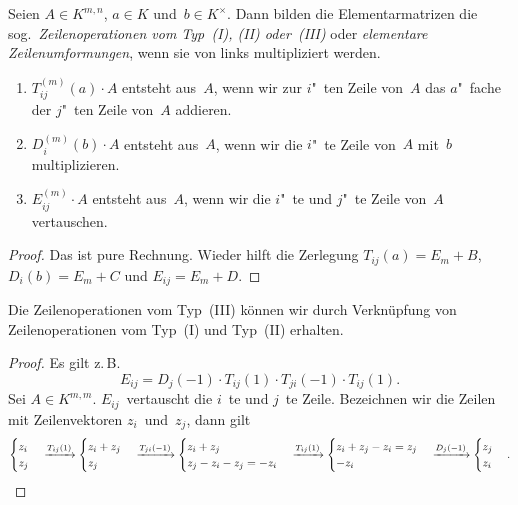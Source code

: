 \documentclass[a4paper]{article}
\begin{document}
\begin{lemma}[Zeilenoperationen]
    Seien $A \in K^{m,n}$, $a \in K$ und~$b \in K^\times$. Dann bilden die Elementarmatrizen die sog.\ \emph{Zeilenoperationen vom Typ~(I), (II) oder~(III)} oder \emph{elementare Zeilenumformungen}, wenn sie von links multipliziert werden.
    \begin{enumerate}
        \item $T_{ij}^{(m)}(a) \cdot A$ entsteht aus~$A$, wenn wir zur $i$"~ten Zeile von~$A$ das $a$"~fache der $j$"~ten Zeile von~$A$ addieren.
        \item $D_i^{(m)}(b) \cdot A$ entsteht aus~$A$, wenn wir die $i$"~te Zeile von~$A$ mit~$b$ multiplizieren.
        \item $E_{ij}^{(m)} \cdot A$ entsteht aus~$A$, wenn wir die $i$"~te und $j$"~te Zeile von~$A$ vertauschen.
    \end{enumerate}
\end{lemma}

\begin{proof}
    Das ist pure Rechnung. Wieder hilft die Zerlegung $T_{ij}(a) = E_m + B$, $D_i(b) = E_m + C$ und $E_{ij} = E_m + D$.
\end{proof}

\begin{lemma}
    Die Zeilenoperationen vom Typ~(III) können wir durch Verknüpfung von Zeilenoperationen vom Typ~(I) und Typ~(II) erhalten.
\end{lemma}

\begin{proof}
    Es gilt z.\,B.\
    \begin{equation*}
        E_{ij} = D_j(-1) \cdot T_{ij}(1) \cdot T_{ji}(-1) \cdot T_{ij}(1).
    \end{equation*}
    Sei $A \in K^{m,m}$. $E_{ij}$~vertauscht die $i$~te und $j$~te Zeile. Bezeichnen wir die Zeilen mit Zeilenvektoren $z_i$~und~$z_j$, dann gilt
    \begin{equation*}
        \begin{cases}
            z_i \\ z_j
        \end{cases}
        \xrightarrow{T_{ij}(1)}
        \begin{cases}
            z_i+z_j \\ z_j
        \end{cases}
        \xrightarrow{T_{ji}(-1)}
        \begin{cases}
            z_i+z_j \\ z_j-z_i-z_j = -z_i
        \end{cases}
        \xrightarrow{T_{ij}(1)}
        \begin{cases}
            z_i+z_j-z_i = z_j \\ -z_i
        \end{cases}
        \xrightarrow{D_j(-1)}
        \begin{cases}
            z_j \\ z_i
        \end{cases}. \qedhere
    \end{equation*}
\end{proof}
\end{document}
